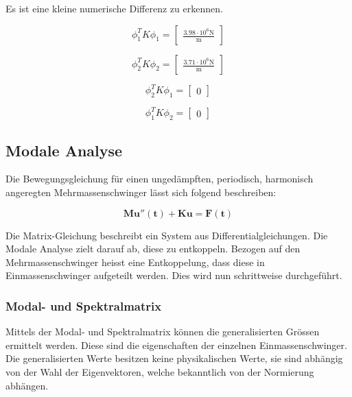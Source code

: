 \documentclass[
  letterpaper,
  DIV=11]{scrreprt}
\begin{document}
Es ist eine kleine numerische Differenz zu erkennen.

\begin{equation*}\phi_{1}^{T} K \phi_{1} = \left[\begin{matrix}\frac{3.98 \cdot 10^{6} \text{N}}{\text{m}}\end{matrix}\right]\end{equation*}

\begin{equation*}\phi_{2}^{T} K \phi_{2} = \left[\begin{matrix}\frac{3.71 \cdot 10^{6} \text{N}}{\text{m}}\end{matrix}\right]\end{equation*}

\begin{equation*}\phi_{2}^{T} K \phi_{1} = \left[\begin{matrix}0\end{matrix}\right]\end{equation*}

\begin{equation*}\phi_{1}^{T} K \phi_{2} = \left[\begin{matrix}0\end{matrix}\right]\end{equation*}

\hypertarget{modale-analyse}{%
\subsection{Modale Analyse}\label{modale-analyse}}

Die Bewegungsgleichung für einen ungedämpften, periodisch, harmonisch
angeregten Mehrmassenschwinger lässt sich folgend beschreiben:

\[\mathbf{M u''(t) + K u = F(t)}\]

Die Matrix-Gleichung beschreibt ein System aus Differentialgleichungen.
Die Modale Analyse zielt darauf ab, diese zu entkoppeln. Bezogen auf den
Mehrmassenschwinger heisst eine Entkoppelung, dass diese in
Einmassenschwinger aufgeteilt werden. Dies wird nun schrittweise
durchgeführt.

\hypertarget{modal--und-spektralmatrix}{%
\subsubsection{Modal- und
Spektralmatrix}\label{modal--und-spektralmatrix}}

Mittels der Modal- und Spektralmatrix können die generalisierten Grössen
ermittelt werden. Diese sind die eigenschaften der einzelnen
Einmassenschwinger. Die generalisierten Werte besitzen keine
physikalischen Werte, sie sind abhängig von der Wahl der Eigenvektoren,
welche bekanntlich von der Normierung abhängen.
\end{document}
